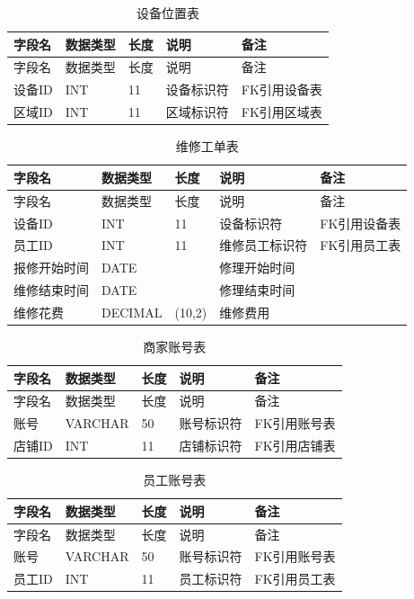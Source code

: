 \documentclass[]{article}
\begin{document}
\begin{longtable}[]{@{}lllll@{}}
\caption{设备位置表}\\
\toprule
字段名 & 数据类型 & 长度 & 说明 & 备注 \\
\midrule
\endfirsthead
\toprule
字段名 & 数据类型 & 长度 & 说明 & 备注 \\
\midrule
\endhead
设备ID & INT & 11 & 设备标识符 & FK引用设备表 \\
区域ID & INT & 11 & 区域标识符 & FK引用区域表 \\
\bottomrule
\end{longtable}

\begin{longtable}[]{@{}lllll@{}}
\caption{维修工单表}\\
\toprule
字段名 & 数据类型 & 长度 & 说明 & 备注 \\
\midrule
\endfirsthead
\toprule
字段名 & 数据类型 & 长度 & 说明 & 备注 \\
\midrule
\endhead
设备ID & INT & 11 & 设备标识符 & FK引用设备表 \\
员工ID & INT & 11 & 维修员工标识符 & FK引用员工表 \\
报修开始时间 & DATE &  & 修理开始时间 & \\
维修结束时间 & DATE &  & 修理结束时间 & \\
维修花费 & DECIMAL & (10,2) & 维修费用 & \\
\bottomrule
\end{longtable}

\begin{longtable}[]{@{}lllll@{}}
\caption{商家账号表}\\
\toprule
字段名 & 数据类型 & 长度 & 说明 & 备注 \\
\midrule
\endfirsthead
\toprule
字段名 & 数据类型 & 长度 & 说明 & 备注 \\
\midrule
\endhead
账号 & VARCHAR & 50 & 账号标识符 & FK引用账号表 \\
店铺ID & INT & 11 & 店铺标识符 & FK引用店铺表 \\
\bottomrule
\end{longtable}

\begin{longtable}[]{@{}lllll@{}}
\caption{员工账号表}\\
\toprule
字段名 & 数据类型 & 长度 & 说明 & 备注 \\
\midrule
\endfirsthead
\toprule
字段名 & 数据类型 & 长度 & 说明 & 备注 \\
\midrule
\endhead
账号 & VARCHAR & 50 & 账号标识符 & FK引用账号表 \\
员工ID & INT & 11 & 员工标识符 & FK引用员工表 \\
\bottomrule
\end{longtable}
\end{document}
